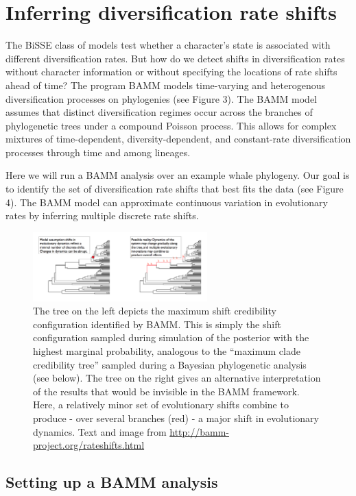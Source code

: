 \documentclass[11pt]{article}
\begin{document}
\section{Inferring diversification rate shifts}

The BiSSE class of models test whether a character's state is associated
with different diversification rates.
But how do we detect shifts in diversification rates
without character information or without specifying the locations
of rate shifts ahead of time?
The program BAMM \citep[Bayesian Analysis of Macroevolutionary Mixtures][]{rabosky2014automatic}
models time-varying and heterogenous diversification processes on phylogenies (see Figure 3).
The BAMM model assumes that  distinct diversification regimes
 occur across the branches of phylogenetic trees under a compound Poisson process.
 This allows for complex mixtures of time-dependent, diversity-dependent, and constant-rate diversification processes
 through time and among lineages.

Here we will run a BAMM analysis over an example whale phylogeny.
Our goal is to identify the set of diversification rate shifts 
that best fits the data (see Figure 4).
The BAMM model can approximate continuous variation in evolutionary rates
by inferring multiple discrete rate shifts.
\begin{figure}[H]
\centering
\includegraphics[width=0.6\textwidth]{x_interpret1.png}
\caption{
    The tree on the left depicts the maximum shift credibility configuration identified by BAMM. This is simply the shift configuration sampled during simulation of the posterior with the highest marginal probability, analogous to the ``maximum clade credibility tree'' sampled during a Bayesian phylogenetic analysis (see below). The tree on the right gives an alternative interpretation of the results that would be invisible in the BAMM framework. Here, a relatively minor set of evolutionary shifts combine to produce - over several branches (red) - a major shift in evolutionary dynamics.
    Text and image from \protect\url{http://bamm-project.org/rateshifts.html}}
\end{figure}

\subsection{Setting up a BAMM analysis}
\end{document}
